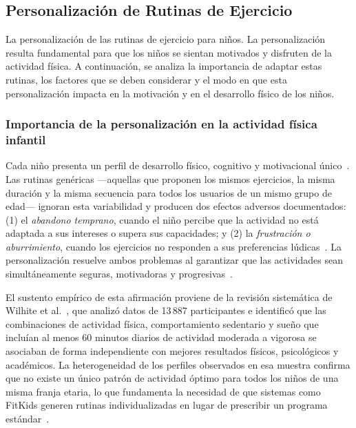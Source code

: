 			\subsection{Personalización de Rutinas de Ejercicio}
				La personalización de las rutinas de ejercicio para niños. La personalización resulta fundamental para que los niños se sientan motivados y disfruten de la actividad física. A continuación, se analiza la importancia de adaptar estas rutinas, los factores que se deben considerar y el modo en que esta personalización impacta en la motivación y en el desarrollo físico de los niños.


				\subsubsection{Importancia de la personalización en la actividad física infantil}
				
				Cada niño presenta un perfil de desarrollo físico, cognitivo y motivacional único~\cite{Wilhite2023}. Las rutinas genéricas ---aquellas que proponen los mismos ejercicios, la misma duración y la misma secuencia para todos los usuarios de un mismo grupo de edad--- ignoran esta variabilidad y producen dos efectos adversos documentados: (1) el \textit{abandono temprano}, cuando el niño percibe que la actividad no está adaptada a sus intereses o supera sus capacidades; y (2) la \textit{frustración o aburrimiento}, cuando los ejercicios no responden a sus preferencias lúdicas~\cite{Hesketh2017}. La personalización resuelve ambos problemas al garantizar que las actividades sean simultáneamente seguras, motivadoras y progresivas~\cite{Zhu2024}.
				
				El sustento empírico de esta afirmación proviene de la revisión sistemática de Wilhite et al.~\cite{Wilhite2023}, que analizó datos de 13\,887 participantes e identificó que las combinaciones de actividad física, comportamiento sedentario y sueño que incluían al menos 60 minutos diarios de actividad moderada a vigorosa se asociaban de forma independiente con mejores resultados físicos, psicológicos y académicos. La heterogeneidad de los perfiles observados en esa muestra confirma que no existe un único patrón de actividad óptimo para todos los niños de una misma franja etaria, lo que fundamenta la necesidad de que sistemas como FitKids generen rutinas individualizadas en lugar de prescribir un programa estándar~\cite{Wilhite2023,Hesketh2017}.

